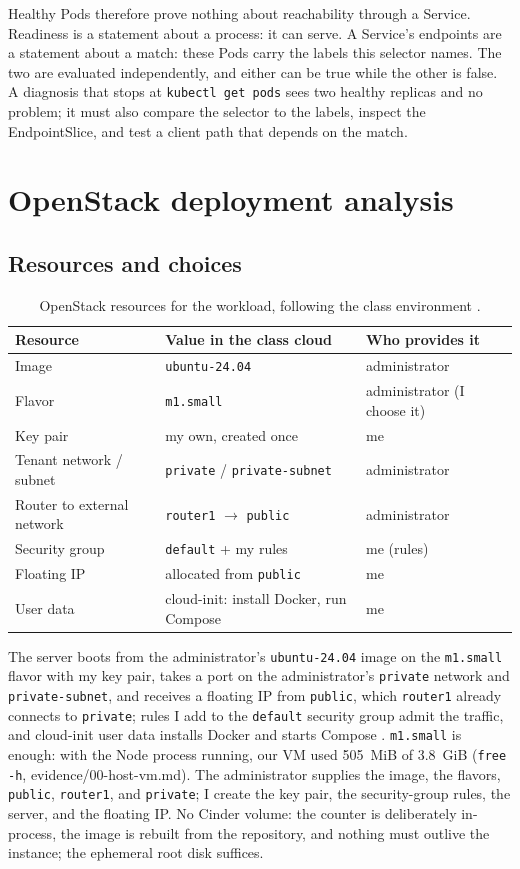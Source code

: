 \documentclass[11pt,letterpaper]{article}
\newcommand{\code}[1]{\texttt{#1}}
\begin{document}
Healthy Pods therefore prove nothing about reachability through a Service. Readiness is a statement about a process: it can serve. A Service's endpoints are a statement about a match: these Pods carry the labels this selector names. The two are evaluated independently, and either can be true while the other is false. A diagnosis that stops at \code{kubectl get pods} sees two healthy replicas and no problem; it must also compare the selector to the labels, inspect the EndpointSlice, and test a client path that depends on the match.

\section{OpenStack deployment analysis}

\subsection{Resources and choices}

\begin{table}[htbp]
\centering\small
\begin{tabular}{@{}lll@{}}
\toprule
Resource & Value in the class cloud & Who provides it \\
\midrule
Image & \code{ubuntu-24.04} & administrator \\
Flavor & \code{m1.small} & administrator (I choose it) \\
Key pair & my own, created once & me \\
Tenant network / subnet & \code{private} / \code{private-subnet} & administrator \\
Router to external network & \code{router1} $\rightarrow$ \code{public} & administrator \\
Security group & \code{default} + my rules & me (rules) \\
Floating IP & allocated from \code{public} & me \\
User data & cloud-init: install Docker, run Compose & me \\
\bottomrule
\end{tabular}
\caption{OpenStack resources for the workload, following the class environment \cite{ex05settings}.}
\end{table}

The server boots from the administrator's \code{ubuntu-24.04} image on the \code{m1.small} flavor with my key pair, takes a port on the administrator's \code{private} network and \code{private-subnet}, and receives a floating IP from \code{public}, which \code{router1} already connects to \code{private}; rules I add to the \code{default} security group admit the traffic, and cloud-init user data installs Docker and starts Compose \cite{ex05settings}. \code{m1.small} is enough: with the Node process running, our VM used 505~MiB of 3.8~GiB (\code{free -h}, evidence/00-host-vm.md). The administrator supplies the image, the flavors, \code{public}, \code{router1}, and \code{private}; I create the key pair, the security-group rules, the server, and the floating IP. No Cinder volume: the counter is deliberately in-process, the image is rebuilt from the repository, and nothing must outlive the instance; the ephemeral root disk suffices.
\end{document}
